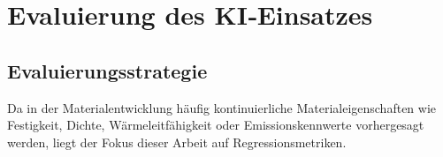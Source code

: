\chapter{ Evaluierung des KI‑Einsatzes}

\section{Evaluierungsstrategie}
Da in der Materialentwicklung häufig kontinuierliche Materialeigenschaften wie Festigkeit, Dichte, Wärmeleitfähigkeit oder Emissionskennwerte vorhergesagt werden, liegt der Fokus dieser Arbeit auf Regressionsmetriken. \cite{michelucci2025best}